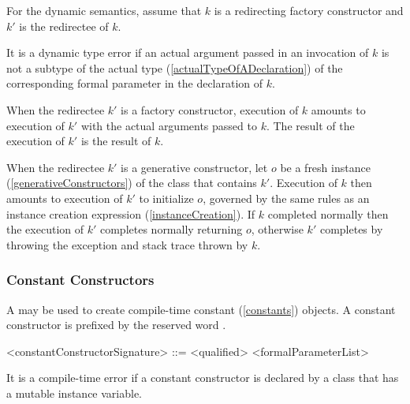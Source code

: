 \documentclass[makeidx]{article}
\begin{document}
\LMHash{}%
For the dynamic semantics,
assume that $k$ is a redirecting factory constructor
and $k'$ is the redirectee of $k$.

\LMHash{}%
It is a dynamic type error if an actual argument passed in an invocation of $k$
is not a subtype of the actual type (\ref{actualTypeOfADeclaration})
of the corresponding formal parameter in the declaration of $k$.

\LMHash{}%
When the redirectee $k'$ is a factory constructor,
execution of $k$ amounts to execution of $k'$ with the actual arguments passed to $k$.
The result of the execution of $k'$ is the result of $k$.

\LMHash{}%
When the redirectee $k'$ is a generative constructor,
let $o$ be a fresh instance (\ref{generativeConstructors})
of the class that contains $k'$.
Execution of $k$ then amounts to execution of $k'$ to initialize $o$,
governed by the same rules as an instance creation expression (\ref{instanceCreation}).
If $k$ completed normally then the execution of $k'$ completes normally returning $o$,
otherwise $k'$ completes by throwing the exception and stack trace thrown by $k$.


\subsubsection{Constant Constructors}

\LMHash{}%
A 
may be used to create compile-time constant (\ref{constants}) objects.
A constant constructor is prefixed by the reserved word \CONST{}.

\begin{grammar}
<constantConstructorSignature> ::= \CONST{} <qualified> <formalParameterList>
\end{grammar}



\LMHash{}%
It is a compile-time error if a constant constructor is declared by a class that has a mutable instance variable.
\end{document}
